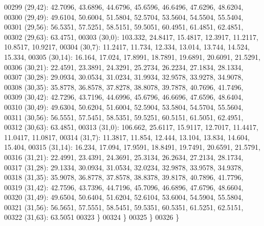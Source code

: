 \begin{DoxyCode}
00299       (29,42): 42.7096, 43.6896, 44.6796, 45.6596, 46.6496, 47.6296, 48.6204,
00300       (29,49): 49.6104, 50.6004, 51.5804, 52.5704, 53.5604, 54.5504, 55.5404,
00301       (29,56): 56.5351, 57.5251, 58.5151, 59.5051, 60.4951, 61.4851, 62.4851,
00302       (29,63): 63.4751,
00303       (30,0): 103.332, 24.8417, 15.4817, 12.3917, 11.2117, 10.8517, 10.9217,
00304       (30,7): 11.2417, 11.734, 12.334, 13.014, 13.744, 14.524, 15.334,
00305       (30,14): 16.164, 17.024, 17.8991, 18.7891, 19.6891, 20.6091, 21.5291,
00306       (30,21): 22.4591, 23.3891, 24.3291, 25.2734, 26.2234, 27.1834, 28.1334,
00307       (30,28): 29.0934, 30.0534, 31.0234, 31.9934, 32.9578, 33.9278, 34.9078,
00308       (30,35): 35.8778, 36.8578, 37.8278, 38.8078, 39.7878, 40.7696, 41.7496,
00309       (30,42): 42.7296, 43.7196, 44.6996, 45.6796, 46.6696, 47.6596, 48.6404,
00310       (30,49): 49.6304, 50.6204, 51.6004, 52.5904, 53.5804, 54.5704, 55.5604,
00311       (30,56): 56.5551, 57.5451, 58.5351, 59.5251, 60.5151, 61.5051, 62.4951,
00312       (30,63): 63.4851,
00313       (31,0): 106.662, 25.6117, 15.9117, 12.7017, 11.4417, 11.0417, 11.0817,
00314       (31,7): 11.3817, 11.854, 12.444, 13.104, 13.834, 14.604, 15.404,
00315       (31,14): 16.234, 17.094, 17.9591, 18.8491, 19.7491, 20.6591, 21.5791,
00316       (31,21): 22.4991, 23.4391, 24.3691, 25.3134, 26.2634, 27.2134, 28.1734,
00317       (31,28): 29.1334, 30.0934, 31.0534, 32.0234, 32.9878, 33.9578, 34.9378,
00318       (31,35): 35.9078, 36.8778, 37.8578, 38.8378, 39.8178, 40.7896, 41.7796,
00319       (31,42): 42.7596, 43.7396, 44.7196, 45.7096, 46.6896, 47.6796, 48.6604,
00320       (31,49): 49.6504, 50.6404, 51.6204, 52.6104, 53.6004, 54.5904, 55.5804,
00321       (31,56): 56.5651, 57.5551, 58.5451, 59.5351, 60.5351, 61.5251, 62.5151,
00322       (31,63): 63.5051
00323       \}
00324    \}
00325 \}
00326 \}
\end{DoxyCode}
